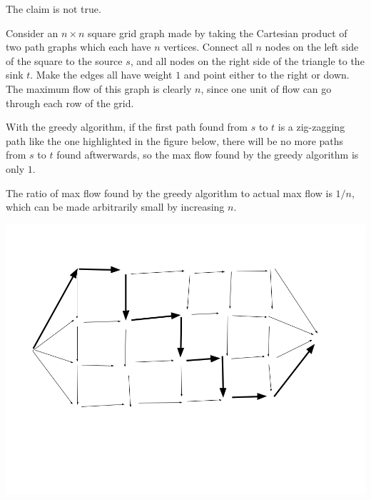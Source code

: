 \documentclass{article}
\begin{document}
\bigskip
\par
\begin{prob}
\end{prob}
The claim is not true.
\par
Consider an $n \times n$ square grid graph made by taking the Cartesian product of two path graphs which each have $n$ vertices. Connect all $n$ nodes on the left side of the square to the source $s$, and all nodes on the right side of the triangle to the sink $t$. Make the edges all have weight $1$ and point either to the right or down. The maximum flow of this graph is clearly $n$, since one unit of flow can go through each row of the grid.
\par
With the greedy algorithm, if the first path found from $s$ to $t$ is a zig-zagging path like the one highlighted in the figure below, there will be no more paths from $s$ to $t$ found aftwerwards, so the max flow found by the greedy algorithm is only $1$.
\par
The ratio of max flow found by the greedy algorithm to actual max flow is $1/n$, which can be made arbitrarily small by increasing $n$.
\begin{center}
    \includegraphics[width=\textwidth]{Untitled drawing.png}
\end{center}
\end{document}
